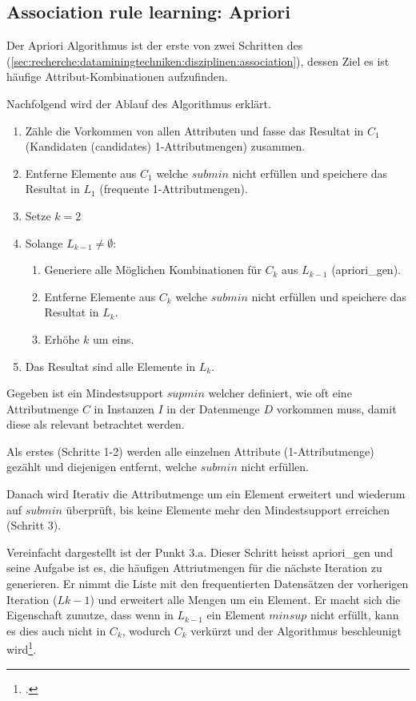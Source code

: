\subsection{Association rule learning: Apriori}
\label{sec:recherche:apriori}
Der Apriori Algorithmus ist der erste von zwei Schritten des  (\cref{sec:recherche:dataminingtechniken:disziplinen:association}), dessen Ziel es ist häufige Attribut-Kombinationen aufzufinden. 

Nachfolgend wird der Ablauf des Algorithmus erklärt.
\begin{enumerate}
	\item Zähle die Vorkommen von allen Attributen und fasse das Resultat in $C_1$ (Kandidaten (candidates) 1-Attributmengen) zusammen.
	\item Entferne Elemente aus $C_1$ welche $submin$ nicht erfüllen und speichere das Resultat in $L_1$ (frequente 1-Attributmengen).
	\item Setze $k=2$
	\item Solange $L_{k-1} \neq \emptyset$:
	\begin {enumerate}
	\item Generiere alle Möglichen Kombinationen für $C_k$ aus $L_{k-1}$ (apriori\_gen).
	\item Entferne Elemente aus $C_k$ welche $submin$ nicht erfüllen und speichere das Resultat in $L_k$.
	\item Erhöhe $k$ um eins.
\end{enumerate}
\item Das Resultat sind alle Elemente in $L_k$.
\end{enumerate}

Gegeben ist ein Mindestsupport $supmin$ welcher definiert, wie oft eine Attributmenge $C$ in Instanzen $I$ in der Datenmenge $D$ vorkommen muss, damit diese als relevant betrachtet werden. 

Als erstes (Schritte 1-2) werden alle einzelnen Attribute (1-Attributmenge) gezählt und diejenigen entfernt, welche $submin$ nicht erfüllen.

Danach wird Iterativ die Attributmenge um ein Element erweitert und wiederum auf $submin$ überprüft, bis keine Elemente mehr den Mindestsupport erreichen (Schritt 3).

Vereinfacht dargestellt ist der Punkt 3.a. Dieser Schritt heisst apriori\_gen und seine Aufgabe ist es, die häufigen Attriutmengen für die nächste Iteration zu generieren. Er nimmt die Liste mit den frequentierten Datensätzen der vorherigen Iteration ($L{k-1}$) und erweitert alle Mengen um ein Element. Er macht sich die Eigenschaft zunutze, dass wenn in $L_{k-1}$ ein Element $minsup$ nicht erfüllt, kann es dies auch nicht in $C_k$, wodurch $C_k$ verkürzt und der Algorithmus beschleunigt wird\footcite{data_mining_concepts_and_techniques}.

